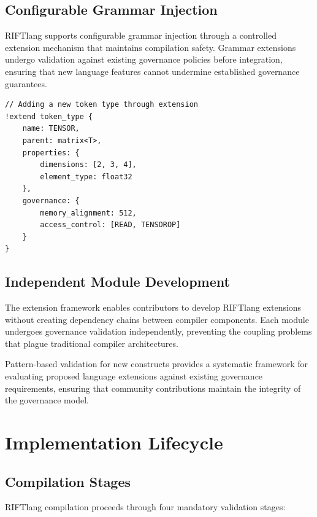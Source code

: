 \subsection{Configurable Grammar Injection}

RIFTlang supports configurable grammar injection through a controlled extension mechanism that maintains compilation safety. Grammar extensions undergo validation against existing governance policies before integration, ensuring that new language features cannot undermine established governance guarantees.

\begin{lstlisting}[style=riftlang, language=rift]
// Adding a new token type through extension
!extend token_type {
    name: TENSOR,
    parent: matrix<T>,
    properties: {
        dimensions: [2, 3, 4],
        element_type: float32
    },
    governance: {
        memory_alignment: 512,
        access_control: [READ, TENSOROP]
    }
}
\end{lstlisting}

\subsection{Independent Module Development}

The extension framework enables contributors to develop RIFTlang extensions without creating dependency chains between compiler components. Each module undergoes governance validation independently, preventing the coupling problems that plague traditional compiler architectures.

Pattern-based validation for new constructs provides a systematic framework for evaluating proposed language extensions against existing governance requirements, ensuring that community contributions maintain the integrity of the governance model.

\section{Implementation Lifecycle}

\subsection{Compilation Stages}

RIFTlang compilation proceeds through four mandatory validation stages:

